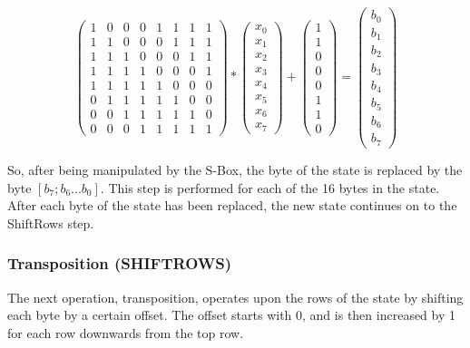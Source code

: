 \documentclass[12pt]{report}
\begin{document}
\[ \left( \begin{array}{cccccccc}
1 & 0 & 0 & 0 & 1 & 1 & 1 & 1 \\
1 & 1 & 0 & 0 & 0 & 1 & 1 & 1 \\
1 & 1 & 1 & 0 & 0 & 0 & 1 & 1 \\
1 & 1 & 1 & 1 & 0 & 0 & 0 & 1 \\
1 & 1 & 1 & 1 & 1 & 0 & 0 & 0 \\
0 & 1 & 1 & 1 & 1 & 1 & 0 & 0 \\
0 & 0 & 1 & 1 & 1 & 1 & 1 & 0 \\
0 & 0 & 0 & 1 & 1 & 1 & 1 & 1\end{array} \right)
*
\left( \begin{array}{c}
x_0 \\
x_1 \\
x_2 \\
x_3 \\
x_4 \\
x_5 \\
x_6 \\
x_7\end{array} \right)
+
\left( \begin{array}{c}
1 \\
1 \\
0 \\
0 \\
0 \\
1 \\
1 \\
0\end{array} \right)
=
\left( \begin{array}{c}
b_0 \\
b_1 \\
b_2 \\
b_3 \\
b_4 \\
b_5 \\
b_6 \\
b_7\end{array} \right)
\]

So, after being manipulated by the S-Box, the byte of the state is replaced by the byte $[b_7; b_6 ... b_0 ]$. This step is performed for each of the 16 bytes in the state. After each byte of the state has been replaced, the new state continues on to the ShiftRows step.



\subsubsection{Transposition (SHIFTROWS)}
The next operation, transposition, operates upon the rows of the state by shifting each byte by a certain offset. The offset starts with 0, and is then increased by 1 for each row downwards from the top row.
\end{document}
